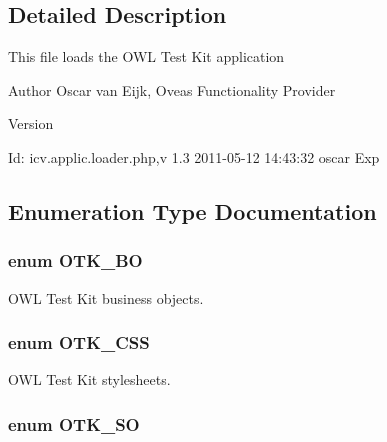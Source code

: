 \subsection{Detailed Description}
This file loads the OWL Test Kit application

\begin{DoxyAuthor}{Author}
Oscar van Eijk, Oveas Functionality Provider 
\end{DoxyAuthor}
\begin{DoxyVersion}{Version}

\end{DoxyVersion}
\begin{DoxyParagraph}{Id:}
icv.applic.loader.php,v 1.3 2011-\/05-\/12 14:43:32 oscar Exp 
\end{DoxyParagraph}


\subsection{Enumeration Type Documentation}
\subsubsection[{OTK\_\-BO}]{\setlength{\rightskip}{0pt plus 5cm}enum {\bf OTK\_\-BO}}\label{otk_8applic_8loader_8php_a8178d2bcfbe9087237254620da3b6d44}


OWL Test Kit business objects. 

\subsubsection[{OTK\_\-CSS}]{\setlength{\rightskip}{0pt plus 5cm}enum {\bf OTK\_\-CSS}}\label{otk_8applic_8loader_8php_a558c8d4c0eefb9ade48675c1b149e126}


OWL Test Kit stylesheets. 

\subsubsection[{OTK\_\-SO}]{\setlength{\rightskip}{0pt plus 5cm}enum {\bf OTK\_\-SO}}\label{otk_8applic_8loader_8php_ad311625b4c1aea3be2b44aad442e005c}


